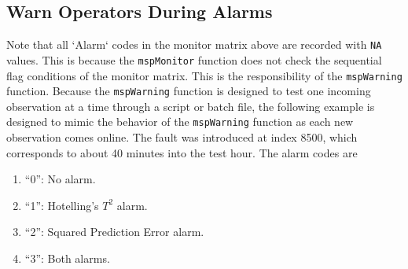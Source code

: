 \documentclass{report}\usepackage[]{graphicx}\usepackage[]{color}
\begin{document}
\subsection{Warn Operators During Alarms}
Note that all `Alarm` codes in the monitor matrix above are recorded with \texttt{NA} values. This is because the \texttt{mspMonitor} function does not check the sequential flag conditions of the monitor matrix. This is the responsibility of the \texttt{mspWarning} function. Because the \texttt{mspWarning} function is designed to test one incoming observation at a time through a script or batch file, the following example is designed to mimic the behavior of the \texttt{mspWarning} function as each new observation comes online.
The fault was introduced at index 8500, which corresponds to about 40 minutes into the test hour.
The alarm codes are
\begin{enumerate}
\item ``0'': No alarm.
\item ``1'': Hotelling's $T^2$ alarm.
\item ``2'': Squared Prediction Error alarm.
\item ``3'': Both alarms.
\end{enumerate}

\end{document}
